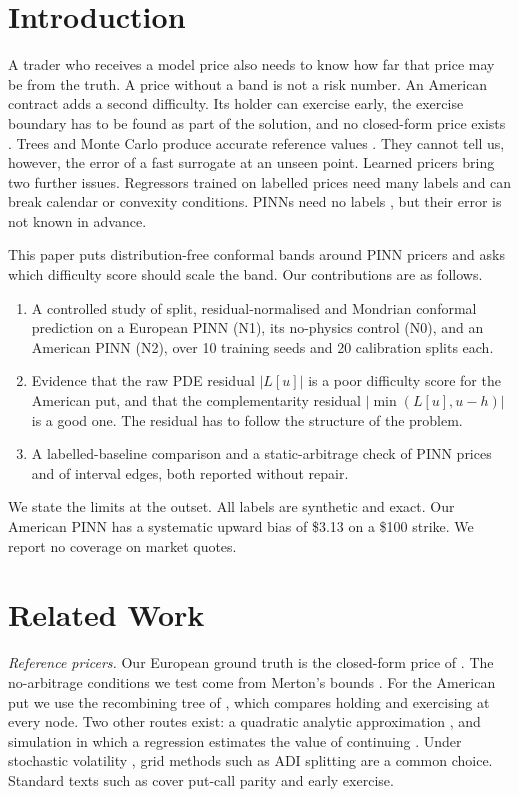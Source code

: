 \documentclass[conference]{IEEEtran}
\newcommand{\usd}{\$}
\begin{document}
\section{Introduction}
A trader who receives a model price also needs to know how far that price may be from the truth. A price without a band is not a risk number. An American contract adds a second difficulty. Its holder can exercise early, the exercise boundary has to be found as part of the solution, and no closed-form price exists \cite{merton1973theory,hull2022options}. Trees and Monte Carlo produce accurate reference values \cite{cox1979option,longstaff2001valuing}. They cannot tell us, however, the error of a fast surrogate at an unseen point. Learned pricers bring two further issues. Regressors trained on labelled prices need many labels and can break calendar or convexity conditions. PINNs need no labels \cite{raissi2019physics}, but their error is not known in advance.

This paper puts distribution-free conformal bands \cite{vovk2005algorithmic,lei2018distribution} around PINN pricers and asks which difficulty score should scale the band. Our contributions are as follows.
\begin{enumerate}
\item A controlled study of split, residual-normalised and Mondrian conformal prediction on a European PINN (N1), its no-physics control (N0), and an American PINN (N2), over 10 training seeds and 20 calibration splits each.
\item Evidence that the raw PDE residual $|L[u]|$ is a poor difficulty score for the American put, and that the complementarity residual $|\min(L[u],u-h)|$ is a good one. The residual has to follow the structure of the problem.
\item A labelled-baseline comparison and a static-arbitrage check of PINN prices and of interval edges, both reported without repair.
\end{enumerate}
We state the limits at the outset. All labels are synthetic and exact. Our American PINN has a systematic upward bias of \usd 3.13 on a \usd 100 strike. We report no coverage on market quotes.

\section{Related Work}
\emph{Reference pricers.} Our European ground truth is the closed-form price of \cite{black1973pricing}. The no-arbitrage conditions we test come from Merton's bounds \cite{merton1973theory}. For the American put we use the recombining tree of \cite{cox1979option}, which compares holding and exercising at every node. Two other routes exist: a quadratic analytic approximation \cite{baroneadesi1987efficient}, and simulation in which a regression estimates the value of continuing \cite{longstaff2001valuing}. Under stochastic volatility \cite{heston1993closed}, grid methods such as ADI splitting \cite{inthout2010adi} are a common choice. Standard texts such as \cite{hull2022options} cover put-call parity and early exercise.
\end{document}
